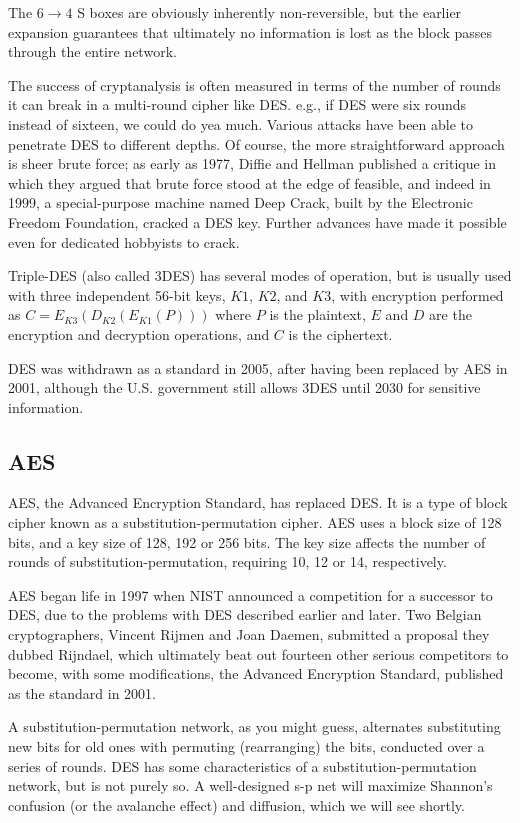 \documentclass[%
 aip,
 jmp,%
 amsmath,amssymb,
 reprint,%
]{revtex4-1}
\begin{document}
The $6 \rightarrow 4$ S boxes are obviously inherently non-reversible,
but the earlier expansion guarantees that ultimately no information is
lost as the block passes through the entire network.

The success of cryptanalysis is often measured in terms of the number
of rounds it can break in a multi-round cipher like DES.  e.g., if DES
were six rounds instead of sixteen, we could do yea much.  Various
attacks have been able to penetrate DES to different depths.  Of
course, the more straightforward approach is sheer brute force; as
early as 1977, Diffie and Hellman published a critique in which they
argued that brute force stood at the edge of feasible, and indeed in
1999, a special-purpose machine named Deep Crack, built by the
Electronic Freedom Foundation, cracked a DES key.  Further advances
have made it possible even for dedicated hobbyists to crack.

Triple-DES (also called 3DES) has several modes of operation, but is
usually used with three independent 56-bit keys, $K1$, $K2$, and $K3$,
with encryption performed as $C = E_{K3}(D_{K2}(E_{K1}(P)))$ where $P$
is the plaintext, $E$ and $D$ are the encryption and decryption
operations, and $C$ is the ciphertext.

DES was withdrawn as a standard in 2005, after having been replaced by
AES in 2001, although the U.S. government still allows 3DES until 2030
for sensitive information.

\subsection{AES}

AES, the Advanced Encryption Standard, has replaced DES.  It is a type of block cipher known as a substitution-permutation cipher.  AES uses a block size of 128 bits, and a key size of 128, 192 or 256 bits. The key size affects the number of rounds of substitution-permutation, requiring 10, 12 or 14, respectively.

AES began life in 1997 when NIST announced a competition for a successor to DES, due to the problems with DES described earlier and later. Two Belgian cryptographers, Vincent Rijmen and Joan Daemen, submitted a proposal they dubbed Rijndael, which ultimately beat out fourteen other serious competitors to become, with some modifications, the Advanced Encryption Standard, published as the standard in 2001.

A substitution-permutation network, as you might guess, alternates substituting new bits for old ones with permuting (rearranging) the bits, conducted over a series of rounds. DES has some characteristics of a substitution-permutation network, but is not purely so. A well-designed s-p net will maximize Shannon's confusion (or the avalanche effect) and diffusion, which we will see shortly.
\end{document}
